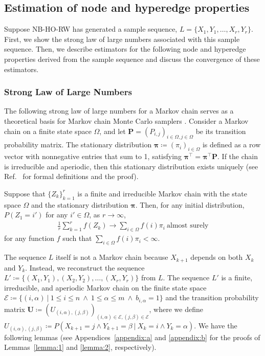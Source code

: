 \subsection{Estimation of node and hyperedge properties}

Suppose NB-HO-RW has generated a sample sequence, $L = \{X_1, Y_1, \ldots, X_r, Y_r\}$. 
First, we show the strong law of large numbers associated with this sample sequence.
Then, we describe estimators for the following node and hyperedge properties derived from the sample sequence and discuss the convergence of these estimators.

\subsubsection{Strong Law of Large Numbers}

The following strong law of large numbers for a Markov chain serves as a theoretical basis for Markov chain Monte Carlo samplers \cite{ribeiro2010,lee2012,li2015,chen2016}.
Consider a Markov chain on a finite state space \(\Omega\), and let \(\bm{P} = (P_{i,j})_{i \in \Omega, j \in \Omega}\) be its transition probability matrix.
The stationary distribution \(\bm{\pi} \coloneq (\pi_i)_{i \in \Omega}\) is defined as a row vector with nonnegative entries that sum to 1, satisfying \(\bm{\pi}^\top = \bm{\pi}^\top \bm{P}\).
If the chain is irreducible and aperiodic, then this stationary distribution exists uniquely (see Ref.~\cite{levin2017} for formal definitions and the proof).
\begin{theorem}
\cite{roberts2004, jones2004}
Suppose that $\{Z_k\}_{k=1}^r$ is a finite and irreducible Markov chain with the state space $\Omega$ and the stationary distribution $\bm{\pi}$. 
Then, for any initial distribution, $P(Z_1 = i')$ for any $i' \in \Omega$, as $r \to \infty$, 
\begin{align*}
\frac{1}{r} \sum_{k=1}^r f(Z_k) \to \sum_{i \in \Omega} f(i) \pi_i\ \text{almost surely}
\end{align*}
for any function $f$ such that $\sum_{i \in \Omega} f(i) \pi_i < \infty$.
\label{theorem:1}
\end{theorem}

The sequence $L$ itself is not a Markov chain because $X_{k+1}$ depends on both $X_k$ and $Y_k$.
Instead, we reconstruct the sequence $L' \coloneq \{(X_1, Y_1), (X_2, Y_2), \ldots, (X_r, Y_r)\}$ from $L$.
The sequence $L'$ is a finite, irreducible, and aperiodic Markov chain on the finite state space $\mathcal{E} \coloneq \{(i, \alpha)\ |\ 1 \leq i \leq n\ \land \ 1 \leq \alpha \leq m\ \land\ b_{i, \alpha} = 1\}$ and the transition probability matrix $\bm{U} \coloneq (U_{(i, \alpha), (j, \beta)})_{(i, \alpha) \in \mathcal{E}, (j, \beta) \in \mathcal{E}}$, where we define $U_{(i, \alpha), (j, \beta)} \coloneq P(X_{k+1} = j \land Y_{k+1} = \beta\ |\ X_k = i \land Y_k = \alpha)$.
We have the following lemmas (see Appendices~\ref{appendix:a} and \ref{appendix:b} for the proofs of Lemmas~\ref{lemma:1} and \ref{lemma:2}, respectively).

